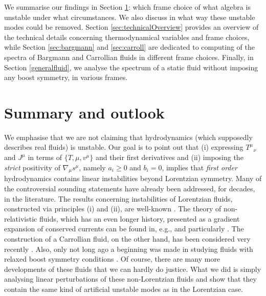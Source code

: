\documentclass[superscriptaddress,prd,nofootinbib,preprintnumbers,longbibliography,11pt,eqsecnum]{revtex4-1}
\begin{document}
 We summarise our findings in Section \ref{sec:summary}: which frame choice of what algebra is unstable under what circumstances. We also discuss in what way these unstable modes could be removed. Section \ref{sec:technicalOverview} provides an overview of the technical details concerning thermodynamical variables and frame choices, while Section \ref{sec:bargmann} and \ref{sec:carroll} are dedicated to computing of the spectra of Bargmann and Carrollian fluids in different frame choices. Finally, in Section \ref{generalfluid}, we analyse the spectrum of a static fluid without imposing any boost symmetry, in various frames.
\section{Summary and outlook}\label{sec:summary}


We emphasise that we are not claiming that hydrodynamics (which supposedly describes real fluids) is unstable. Our goal is to point out that (i) expressing $T^{\mu}_{\;\;\,\nu}$ and $J^\mu$ in terms of $\{ T, \mu, v^\mu\}$ and their first derivatives and (ii) imposing the \textit{strict} positivity of $\nabla_\mu s^\mu$, namely $a_i \ge 0$ and $b_i =0$, implies that \textit{first order} hydrodynamics contains linear instabilities beyond Lorentzian symmetry. Many of the controversial sounding statements have already been addressed, for decades, in the literature. The results concerning instabilities of Lorentzian fluids, constructed via principles (i) and (ii), are well-known \cite{Hiscock:1985zz,rezzolla2013relativistic}. The theory of non-relativistic fluids, which has an even longer history, presented as a gradient expansion of conserved currents can be found in, e.g., \cite{LLfluid,Son:2005rv} and particularly \cite{Jensen:2014ama}. The construction of a Carrollian fluid, on the other hand, has been considered very recently \cite{Ciambelli:2018wre,Ciambelli:2018xat,deBoer:2017ing}. Also, only not long ago a beginning was made in studying fluids with relaxed boost symmetry conditions \cite{deBoer:2017ing,deBoer:2017abi}. Of course, there are many more developments of these fluids that we can hardly do justice. What we did is simply analysing linear perturbations of these non-Lorentzian fluids and show that they contain the same kind of artificial unstable modes as in the Lorentzian case.
\end{document}
